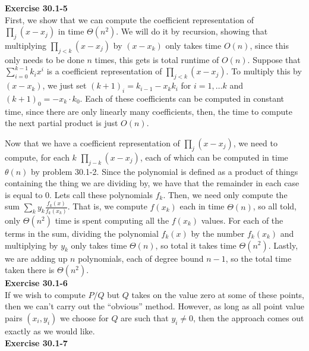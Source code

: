 \documentclass{article}
\begin{document}
\noindent\textbf{Exercise 30.1-5}\\

First, we show that we can compute the coefficient representation of $\prod_{j} (x-x_j)$ in time $\Theta(n^2)$. We will do it by recursion, showing that multiplying $\prod_{j<k} (x-x_j)$ by $(x-x_k)$ only takes time $O(n)$, since this only needs to be done $n$ times, this gets is total runtime of $O(n)$. Suppose that $\sum_{i=0}^{k-1} {k_i}x^i$ is a coefficient representation of $\prod_{j<k} (x-x_j)$. To multiply this by $(x-x_k)$, we just set $(k+1)_i = k_{i-1} - x_k k_i$ for $i= 1,\ldots k$ and $(k+1)_0 = -x_k \cdot k_0$. Each of these coefficients can be computed in constant time, since there are only linearly many coefficients, then, the time to compute the next partial product is just $O(n)$.

Now that we have a coefficient representation of $\prod_j (x-x_j)$, we need to compute, for each $k$ $\prod_{j-k} (x-x_j)$, each of which can be computed in time $\theta(n)$ by problem 30.1-2. Since the polynomial is defined as a product of things containing the thing we are dividing by, we have that the remainder in each case is equal to 0. Lets call these polynomials $f_k$. Then, we need only compute the sum $\sum_{k} y_k \frac{f_k(x)}{f_k(x_k)}$. That is, we compute $f(x_k)$ each in time $\Theta(n)$, so all told, only $\Theta(n^2)$ time is spent computing all the $f(x_k)$ values. For each of the terms in the sum, dividing the polynomial $f_k(x)$ by the number $f_k(x_k)$ and multiplying by $y_k$ only takes time $\Theta(n)$, so total it takes time $\Theta(n^2)$. Lastly, we are adding up $n$ polynomials, each of degree bound $n-1$, so the total time taken there is $\Theta(n^2)$.\\

\noindent\textbf{Exercise 30.1-6}\\

If we wish to compute $P/Q$ but $Q$ takes on the value zero at some of these points, then we can't carry out the ``obvious'' method.  However, as long as all point value pairs $(x_i,y_i)$ we choose for $Q$ are such that $y_i \neq 0$, then the approach comes out exactly as we would like. \\


\noindent\textbf{Exercise 30.1-7}\\
\end{document}
